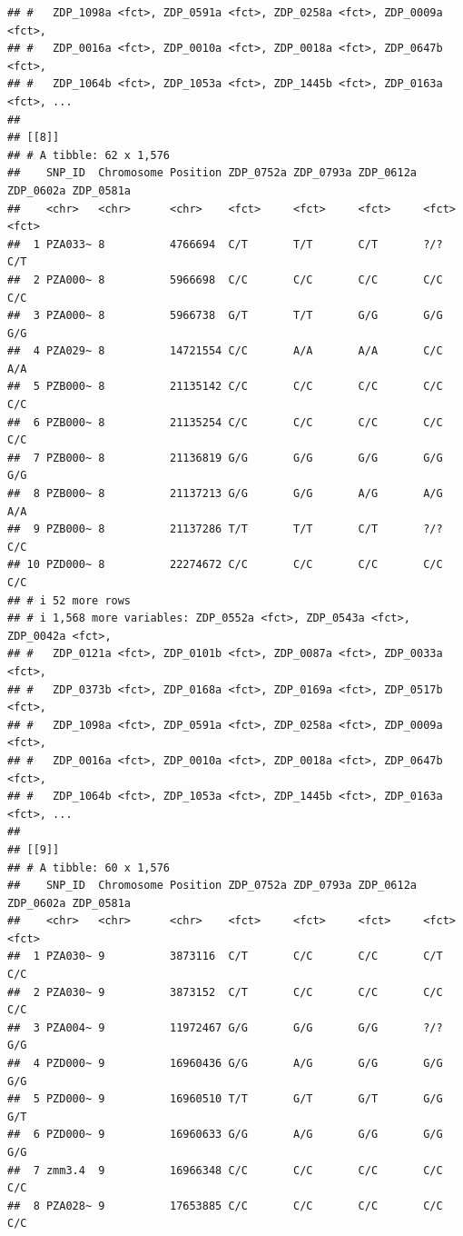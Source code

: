 \documentclass[
]{article}
\begin{document}
\begin{verbatim}
## #   ZDP_1098a <fct>, ZDP_0591a <fct>, ZDP_0258a <fct>, ZDP_0009a <fct>,
## #   ZDP_0016a <fct>, ZDP_0010a <fct>, ZDP_0018a <fct>, ZDP_0647b <fct>,
## #   ZDP_1064b <fct>, ZDP_1053a <fct>, ZDP_1445b <fct>, ZDP_0163a <fct>, ...
## 
## [[8]]
## # A tibble: 62 x 1,576
##    SNP_ID  Chromosome Position ZDP_0752a ZDP_0793a ZDP_0612a ZDP_0602a ZDP_0581a
##    <chr>   <chr>      <chr>    <fct>     <fct>     <fct>     <fct>     <fct>    
##  1 PZA033~ 8          4766694  C/T       T/T       C/T       ?/?       C/T      
##  2 PZA000~ 8          5966698  C/C       C/C       C/C       C/C       C/C      
##  3 PZA000~ 8          5966738  G/T       T/T       G/G       G/G       G/G      
##  4 PZA029~ 8          14721554 C/C       A/A       A/A       C/C       A/A      
##  5 PZB000~ 8          21135142 C/C       C/C       C/C       C/C       C/C      
##  6 PZB000~ 8          21135254 C/C       C/C       C/C       C/C       C/C      
##  7 PZB000~ 8          21136819 G/G       G/G       G/G       G/G       G/G      
##  8 PZB000~ 8          21137213 G/G       G/G       A/G       A/G       A/A      
##  9 PZB000~ 8          21137286 T/T       T/T       C/T       ?/?       C/C      
## 10 PZD000~ 8          22274672 C/C       C/C       C/C       C/C       C/C      
## # i 52 more rows
## # i 1,568 more variables: ZDP_0552a <fct>, ZDP_0543a <fct>, ZDP_0042a <fct>,
## #   ZDP_0121a <fct>, ZDP_0101b <fct>, ZDP_0087a <fct>, ZDP_0033a <fct>,
## #   ZDP_0373b <fct>, ZDP_0168a <fct>, ZDP_0169a <fct>, ZDP_0517b <fct>,
## #   ZDP_1098a <fct>, ZDP_0591a <fct>, ZDP_0258a <fct>, ZDP_0009a <fct>,
## #   ZDP_0016a <fct>, ZDP_0010a <fct>, ZDP_0018a <fct>, ZDP_0647b <fct>,
## #   ZDP_1064b <fct>, ZDP_1053a <fct>, ZDP_1445b <fct>, ZDP_0163a <fct>, ...
## 
## [[9]]
## # A tibble: 60 x 1,576
##    SNP_ID  Chromosome Position ZDP_0752a ZDP_0793a ZDP_0612a ZDP_0602a ZDP_0581a
##    <chr>   <chr>      <chr>    <fct>     <fct>     <fct>     <fct>     <fct>    
##  1 PZA030~ 9          3873116  C/T       C/C       C/C       C/T       C/C      
##  2 PZA030~ 9          3873152  C/T       C/C       C/C       C/C       C/C      
##  3 PZA004~ 9          11972467 G/G       G/G       G/G       ?/?       G/G      
##  4 PZD000~ 9          16960436 G/G       A/G       G/G       G/G       G/G      
##  5 PZD000~ 9          16960510 T/T       G/T       G/T       G/G       G/T      
##  6 PZD000~ 9          16960633 G/G       A/G       G/G       G/G       G/G      
##  7 zmm3.4  9          16966348 C/C       C/C       C/C       C/C       C/C      
##  8 PZA028~ 9          17653885 C/C       C/C       C/C       C/C       C/C      

\end{verbatim}
\end{document}
